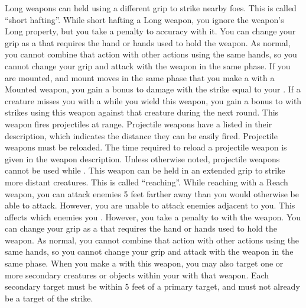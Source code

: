             Long weapons can held using a different grip to strike nearby foes.
            This is called ``short hafting''.
            While short hafting a Long weapon, you ignore the weapon's Long property, but you take a  penalty to accuracy with it.
            You can change your grip as a  that requires the hand or hands used to hold the weapon.
            As normal, you cannot combine that action with other actions using the same hands, so you cannot change your grip and attack with the weapon in the same phase.
            \label{Mounted Weapon} If you are mounted, and mount moves in the same phase that you make a  with a Mounted weapon, you gain a bonus to damage with the strike equal to your .
             If a creature misses you with a  while you wield this weapon, you gain a  bonus to  with strikes using this weapon against that creature during the next round.
             This weapon fires projectiles at range. Projectile weapons have a  listed in their description, which indicates the distance they can be easily fired. Projectile weapons must be reloaded. The time required to reload a projectile weapon is given in the weapon description.
            Unless otherwise noted, projectile weapons cannot be used while \prone.
            \label{Reach Weapon} This weapon can be held in an extended grip to strike more distant creatures.
            This is called ``reaching''.
            While reaching with a Reach weapon, you can attack enemies 5 feet farther away than you would otherwise be able to attack.
            However, you are unable to attack enemies adjacent to you.
            This affects which enemies you .
            However, you take a  penalty to  with the weapon.
            You can change your grip as a  that requires the hand or hands used to hold the weapon.
            As normal, you cannot combine that action with other actions using the same hands, so you cannot change your grip and attack with the weapon in the same phase.
            \label{Sweeping} When you make a  with this weapon, you may also target one or more secondary creatures or objects within your  with that weapon.
            Each secondary target must be within 5 feet of a primary target, and must not already be a target of the strike.
